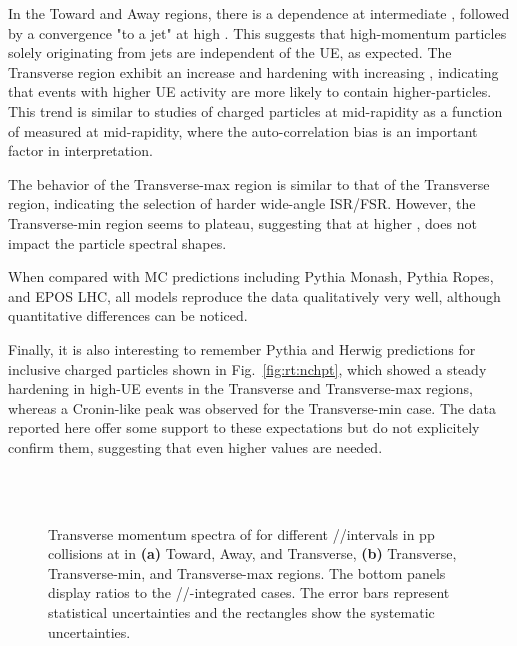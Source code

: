 In the Toward and Away regions, there is a dependence at intermediate \pt, followed by a convergence "to a jet" at high \pt. This suggests that high-momentum particles solely originating from jets are independent of the UE, as expected. The Transverse region exhibit an increase and hardening with increasing \RT, indicating that events with higher UE activity are more likely to contain higher-\pt particles. This trend is similar to studies of charged particles at mid-rapidity as a function of \Nch measured at mid-rapidity, where the auto-correlation bias is an important factor in interpretation.

The behavior of the Transverse-max region is similar to that of the Transverse region, indicating the selection of harder wide-angle ISR/FSR. However, the Transverse-min region seems to plateau, suggesting that at higher \pt, \RTmin does not impact the particle \pt spectral shapes.

When compared with MC predictions including Pythia Monash, Pythia Ropes, and EPOS LHC, all models reproduce the data qualitatively very well, although quantitative differences can be noticed.

Finally, it is also interesting to remember Pythia and Herwig predictions for inclusive charged particles shown in Fig.~\ref{fig:rt:nchpt}, which showed a steady hardening in high-UE events in the Transverse and Transverse-max regions, whereas a Cronin-like peak was observed for the Transverse-min case. The data reported here offer some support to these expectations but do not explicitely confirm them, suggesting that even higher \RTmin values are needed.

\begin{figure}[H]%
\\
\\
\caption{Transverse momentum spectra of \KOs for different \RT/\RTmin/\RTmax intervals in pp collisions at  in \textbf{(a)} Toward, Away, and Transverse, \textbf{(b)} Transverse, Transverse-min, and Transverse-max regions. The bottom panels display ratios to the \RT/\RTmin/\RTmax-integrated cases. The error bars represent statistical uncertainties and the rectangles show the systematic uncertainties.}
\label{fig:rt:ptK0s}
\end{figure}


